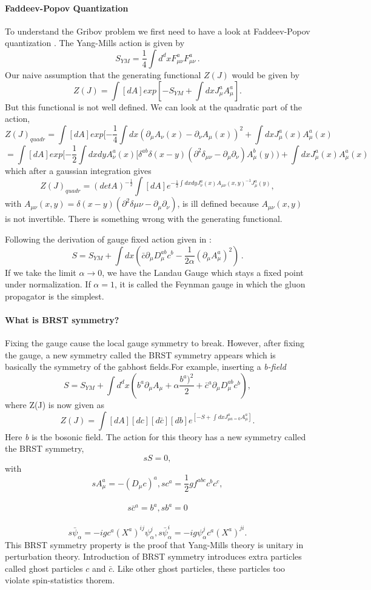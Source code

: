 \paragraph{Faddeev-Popov Quantization}
To understand the Gribov problem we first need to have a look at
Faddeev-Popov quantization . The Yang-Mills action
 is given by
\[
S_{YM}= \frac{1}{4}\int d^{d}x
F^{a}_{\mu\nu}F^{a}_{\mu\nu}
\,.
\]
Our naive assumption that the
generating functional $Z(J)$ would be given by $$Z(J)=\int
[dA]exp[-S_{YM}+\int dx J^{a}_{\mu}A^{a}_{\mu}].$$ But this functional is
not well defined. We can look at the quadratic part of the action,
$$Z(J)_{quadr}=\int[dA] exp[-\frac{1}{4}\int dx
(\partial_{\mu}A_{\nu}(x)-\partial_{\nu}A_{\mu}(x))^{2}+\int dx
J^{a}_{\mu}(x)A^{a}_{\mu}(x)$$ $$ =\int[dA] exp[-\frac{1}{2}\int dx dy
A^{a}_{\nu}(x)[\delta^{ab} \delta (x-y)(\partial^{2}
\delta_{\mu\nu}-\partial_{\mu}\partial_{\nu})A^{b}_{\mu}(y))+\int dx
J^{a}_{\mu}(x)A^{a}_{\mu}(x) $$ which after a gaussian integration gives
$$ Z(J)_{quadr}=(detA)^{-\frac{1}{2}} \int[dA] e^{-\frac{1}{2}\int dx dy
J^{a}_{\nu}(x) A_{\mu\nu}(x,y)^{-1} J^{a}_{\mu}(y)},$$ with
$A_{\mu\nu}(x,y)=
\delta(x-y)(\partial^{2}\delta{\mu\nu}-\partial_{\mu}\partial_{\nu})$,
is ill defined because $A_{\mu\nu}(x,y)$ is not invertible. There is
something wrong with the generating functional.

Following the derivation of gauge fixed action given in
:
\[
S=S_{YM}+\int dx (\bar{c}\partial_{\mu}D^{ab}_{\mu}c^{b}
 -\frac{1}{2 \alpha}(\partial_{\mu}A^{a}_{\mu})^{2})
\,.
\]
If we take the limit $\alpha \rightarrow 0$, we have the Landau Gauge which stays a fixed point under normalization. If $\alpha=1$, it is called the Feynman gauge in which the gluon propagator is the simplest.

\paragraph{What is BRST symmetry?}
Fixing the gauge cause the local gauge symmetry to break. However, after fixing the gauge, a new symmetry called the BRST symmetry appears which is basically the symmetry of the g{ab}host fields.For example, inserting a \emph{b-field} $$ S=S_{YM} + \int d^{d}x (b^{a} \partial_{\mu} A_{\mu} +\alpha \frac{b^{a})^2}{2} + \bar{c}^{a}\partial_{\mu}D^{ab}_{\mu} c^{b}),$$ where Z(J) is now given as $$Z(J)=\int[dA][dc][d\bar{c}][db] e^{[-S+\int dx J^{a}_{\mu{a}=0}A^{a}_{\mu}]}.$$ Here \emph{b} is the bosonic field. The action for this theory has a new symmetry called the BRST symmetry, $$sS=0,$$ with $$s A^{a}_{\mu}=-(D_{\mu}c)^{a}, sc^{a}=\frac{1}{2}gf^{abc}c^{b}c^{c},$$\\ $$s\bar{c}^{a}=b^{a}, sb^{a}=0 $$ \\
$$s\bar{\psi}_{\alpha}=-i g c^{a} (X^{a})^{ij} \psi^{j}_{\alpha}, s\bar{\psi}^{i}_{\alpha}=-i g \psi^{j}_{\alpha} c^{a} (X^{a})^{ji}.$$
This BRST symmetry property is the proof that Yang-Mills theory is unitary in perturbation theory. Introduction of BRST symmetry introduces extra particles called ghost particles $c$ and $\bar{c}$. Like other ghost particles, these particles too violate spin-statistics thorem.


